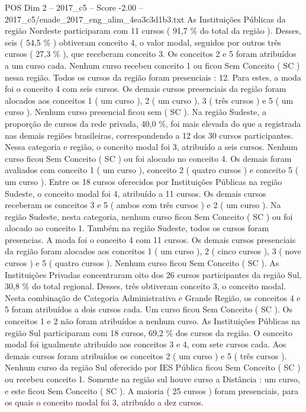 \begin{textsample}{POS Dim 2 – 2017\_c5 – Score -2.00 – 2017\_c5/enade\_2017\_eng\_alim\_4ea3c3d1b3.txt}
As Instituições Públicas da região Nordeste participaram com 11 cursos ( 91,7 \% do total da região ).
Desses, seis ( 54,5 \% ) obtiveram conceito 4, o valor modal, seguidos por outros três cursos ( 27,3 \% ), que receberam conceito 3.
Os conceitos 2 e 5 foram atribuídos a um curso cada.
Nenhum curso recebeu conceito 1 ou ficou Sem Conceito ( SC ) nessa região.
Todos os cursos da região foram presenciais : 12.
Para estes, a moda foi o conceito 4 com seis cursos.
Os demais cursos presenciais da região foram alocados aos conceitos 1 ( um curso ), 2 ( um curso ), 3 ( três cursos ) e 5 ( um curso ).
Nenhum curso presencial ficou sem ( SC ).
Na região Sudeste, a proporção de cursos da rede privada, 40,0 \%, foi mais elevada do que a registrada nas demais regiões brasileiras, correspondendo a 12 dos 30 cursos participantes.
Nessa categoria e região, o conceito modal foi 3, atribuído a seis cursos.
Nenhum curso ficou Sem Conceito ( SC ) ou foi alocado no conceito 4.
Os demais foram avaliados com conceito 1 ( um curso ), conceito 2 ( quatro cursos ) e conceito 5 ( um curso ).
Entre os 18 cursos oferecidos por Instituições Públicas na região Sudeste, o conceito modal foi 4, atribuído a 11 cursos.
Os demais cursos receberam os conceitos 3 e 5 ( ambos com três cursos ) e 2 ( um curso ).
Na região Sudeste, nesta categoria, nenhum curso ficou Sem Conceito ( SC ) ou foi alocado ao conceito 1.
Também na região Sudeste, todos os cursos foram presencias.
A moda foi o conceito 4 com 11 cursos.
Os demais cursos presenciais da região foram alocados aos conceitos 1 ( um curso ), 2 ( cinco cursos ), 3 ( nove cursos ) e 5 ( quatro cursos ).
Nenhum curso ficou Sem Conceito ( SC ).
As Instituições Privadas concentraram oito dos 26 cursos participantes da região Sul, 30,8 \% do total regional.
Desses, três obtiveram conceito 3, o conceito modal.
Nesta combinação de Categoria Administrativa e Grande Região, os conceitos 4 e 5 foram atribuídos a dois cursos cada.
Um curso ficou Sem Conceito ( SC ).
Os conceitos 1 e 2 não foram atribuídos a nenhum curso.
As Instituições Públicas na região Sul participaram com 18 cursos, 69,2 \% dos cursos da região.
O conceito modal foi igualmente atribuído aos conceitos 3 e 4, com sete cursos cada.
Aos demais cursos foram atribuídos os conceitos 2 ( um curso ) e 5 ( três cursos ).
Nenhum curso da região Sul oferecido por IES Pública ficou Sem Conceito ( SC ) ou recebeu conceito 1.
Somente na região sul houve curso a Distância : um curso, e este ficou Sem Conceito ( SC ).
A maioria ( 25 cursos ) foram presenciais, para os quais o conceito modal foi 3, atribuído a dez cursos.

\end{textsample}
